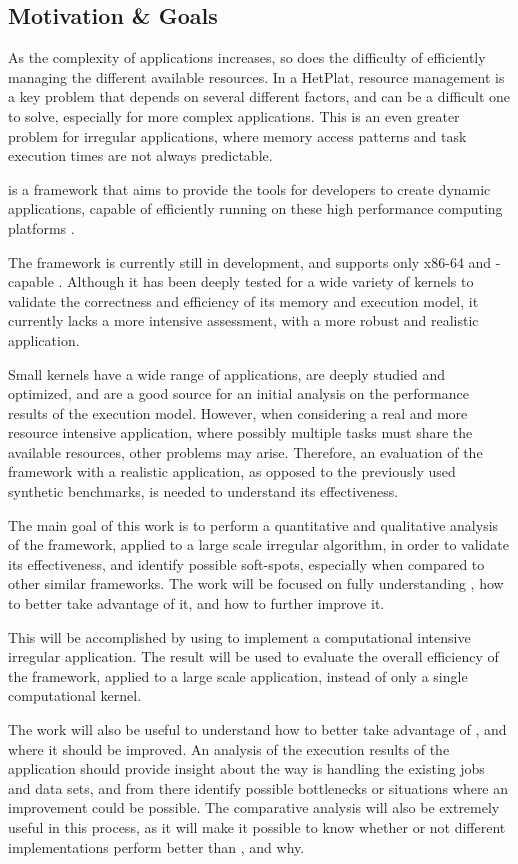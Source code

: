 \documentclass[main.tex]{subfiles}
\begin{document}
\subsection{Motivation \& Goals}

As the complexity of applications increases, so does the difficulty of efficiently managing the different available resources. In a \ac{HetPlat}, resource management is a key problem that depends on several different factors, and can be a difficult one to solve, especially for more complex applications. This is an even greater problem for irregular applications, where memory access patterns and task execution times are not always predictable.

\gama is a framework that aims to provide the tools for developers to create dynamic applications, capable of efficiently running on these high performance computing platforms \cite{joao2012gama}.

The \gama framework is currently still in development, and supports only x86-64 \cpus and \cuda-capable \gpus. Although it has been deeply tested for a wide variety of kernels to validate the correctness and efficiency of its memory and execution model, it currently lacks a more intensive assessment, with a more robust and realistic application.

Small kernels have a wide range of applications, are deeply studied and optimized, and are a good source for an initial analysis on the performance results of the execution model. However, when considering a real and more resource intensive application, where possibly multiple tasks must share the available resources, other problems may arise. Therefore, an evaluation of the framework with a realistic application, as opposed to the previously used synthetic benchmarks, is needed to understand its effectiveness.

The main goal of this work is to perform a quantitative and qualitative analysis of the \gama framework, applied to a large scale irregular algorithm, in order to validate its effectiveness, and identify possible soft-spots, especially when compared to other similar frameworks. The work will be focused on fully understanding \gama, how to better take advantage of it, and how to further improve it.

This will be accomplished by using \gama to implement a computational intensive irregular application. The result will be used to evaluate the overall efficiency of the \gama framework, applied to a large scale application, instead of only a single computational kernel.

The work will also be useful to understand how to better take advantage of \gama, and where it should be improved. An analysis of the execution results of the application should provide insight about the way \gama is handling the existing jobs and data sets, and from there identify possible bottlenecks or situations where an improvement could be possible. The comparative analysis will also be extremely useful in this process, as it will make it possible to know whether or not different implementations perform better than \gama, and why.
\end{document}
